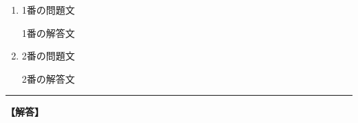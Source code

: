     \openKaiFile
    \begin{enumerate}[1.\ ]
	    \item 1番の問題文
    	    \begin{Kaitou}
        	    1番の解答文
	        \end{Kaitou}
    	\item 2番の問題文
    	    \begin{Kaitou}
        	    2番の解答文
	        \end{Kaitou}
    \end{enumerate}
    \closeKaiFile
    \vfill
    \hrule
    \begin{center}\textbf{【解答】}\end{center}
    \small%
